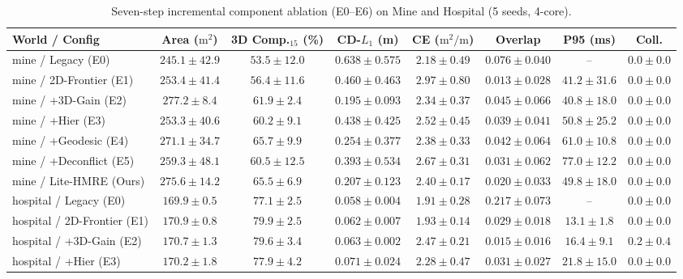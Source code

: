 \begin{table}[t]
\centering
\caption{Seven-step incremental component ablation (E0--E6) on Mine and Hospital (5 seeds, 4-core).}
\label{tab:ablation}
\footnotesize
\begin{tabular}{lccccccc}
\toprule
World / Config & Area ($\text{m}^2$) & 3D Comp.$_{15}$ (\%) & CD-$L_1$ (m) & CE ($\text{m}^2/\text{m}$) & Overlap & P95 (ms) & Coll. \\
\midrule
mine / Legacy (E0) & $245.1 \pm 42.9$ & $53.5 \pm 12.0$ & $0.638 \pm 0.575$ & $2.18 \pm 0.49$ & $0.076 \pm 0.040$ & -- & $\mathbf{0.0 \pm 0.0}$ \\
mine / 2D-Frontier (E1) & $253.4 \pm 41.4$ & $56.4 \pm 11.6$ & $0.460 \pm 0.463$ & $\mathbf{2.97 \pm 0.80}$ & $\mathbf{0.013 \pm 0.028}$ & $41.2 \pm 31.6$ & $\mathbf{0.0 \pm 0.0}$ \\
mine / +3D-Gain (E2) & $\mathbf{277.2 \pm 8.4}$ & $61.9 \pm 2.4$ & $\mathbf{0.195 \pm 0.093}$ & $2.34 \pm 0.37$ & $0.045 \pm 0.066$ & $\mathbf{40.8 \pm 18.0}$ & $\mathbf{0.0 \pm 0.0}$ \\
mine / +Hier (E3) & $253.3 \pm 40.6$ & $60.2 \pm 9.1$ & $0.438 \pm 0.425$ & $2.52 \pm 0.45$ & $0.039 \pm 0.041$ & $50.8 \pm 25.2$ & $\mathbf{0.0 \pm 0.0}$ \\
mine / +Geodesic (E4) & $271.1 \pm 34.7$ & $\mathbf{65.7 \pm 9.9}$ & $0.254 \pm 0.377$ & $2.38 \pm 0.33$ & $0.042 \pm 0.064$ & $61.0 \pm 10.8$ & $\mathbf{0.0 \pm 0.0}$ \\
mine / +Deconflict (E5) & $259.3 \pm 48.1$ & $60.5 \pm 12.5$ & $0.393 \pm 0.534$ & $2.67 \pm 0.31$ & $0.031 \pm 0.062$ & $77.0 \pm 12.2$ & $\mathbf{0.0 \pm 0.0}$ \\
mine / Lite-HMRE (Ours) & $275.6 \pm 14.2$ & $65.5 \pm 6.9$ & $0.207 \pm 0.123$ & $2.40 \pm 0.17$ & $0.020 \pm 0.033$ & $49.8 \pm 18.0$ & $\mathbf{0.0 \pm 0.0}$ \\
\midrule
hospital / Legacy (E0) & $169.9 \pm 0.5$ & $77.1 \pm 2.5$ & $\mathbf{0.058 \pm 0.004}$ & $1.91 \pm 0.28$ & $0.217 \pm 0.073$ & -- & $\mathbf{0.0 \pm 0.0}$ \\
hospital / 2D-Frontier (E1) & $\mathbf{170.9 \pm 0.8}$ & $\mathbf{79.9 \pm 2.5}$ & $0.062 \pm 0.007$ & $1.93 \pm 0.14$ & $0.029 \pm 0.018$ & $\mathbf{13.1 \pm 1.8}$ & $\mathbf{0.0 \pm 0.0}$ \\
hospital / +3D-Gain (E2) & $170.7 \pm 1.3$ & $79.6 \pm 3.4$ & $0.063 \pm 0.002$ & $2.47 \pm 0.21$ & $0.015 \pm 0.016$ & $16.4 \pm 9.1$ & $0.2 \pm 0.4$ \\
hospital / +Hier (E3) & $170.2 \pm 1.8$ & $77.9 \pm 4.2$ & $0.071 \pm 0.024$ & $2.28 \pm 0.47$ & $0.031 \pm 0.027$ & $21.8 \pm 15.0$ & $\mathbf{0.0 \pm 0.0}$ \\

\end{tabular}
\end{table}
